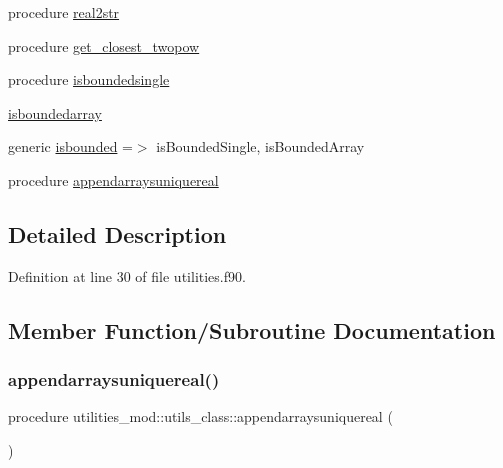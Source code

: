 \begin{DoxyCompactItemize}
\item 
procedure \mbox{\hyperlink{structutilities__mod_1_1utils__class_a150e3763affd525139f135d6cbbca026}{real2str}}
\item 
procedure \mbox{\hyperlink{structutilities__mod_1_1utils__class_a2fa5e32b744821f0c74e30aeb99e1e2b}{get\+\_\+closest\+\_\+twopow}}
\item 
procedure \mbox{\hyperlink{structutilities__mod_1_1utils__class_aac36fc53d19b8bd8c37a2dfcf74f1fcc}{isboundedsingle}}
\item 
\mbox{\hyperlink{structutilities__mod_1_1utils__class_ae513529301733a624bcb1e984131edcd}{isboundedarray}}
\item 
generic \mbox{\hyperlink{structutilities__mod_1_1utils__class_acd0be828aa3a873c635cb9742ef06b13}{isbounded}} =$>$ is\+Bounded\+Single, is\+Bounded\+Array
\item 
procedure \mbox{\hyperlink{structutilities__mod_1_1utils__class_aeb0f0bfbea1b5a1d1dc5ed88abd272fb}{appendarraysuniquereal}}
\end{DoxyCompactItemize}


\subsection{Detailed Description}


Definition at line 30 of file utilities.\+f90.



\subsection{Member Function/\+Subroutine Documentation}
\mbox{\label{structutilities__mod_1_1utils__class_aeb0f0bfbea1b5a1d1dc5ed88abd272fb}} 
\subsubsection{\texorpdfstring{appendarraysuniquereal()}{appendarraysuniquereal()}}
{\footnotesize\ttfamily procedure utilities\+\_\+mod\+::utils\+\_\+class\+::appendarraysuniquereal (\begin{DoxyParamCaption}{ }\end{DoxyParamCaption})\hspace{0.3cm}{\ttfamily [private]}}



